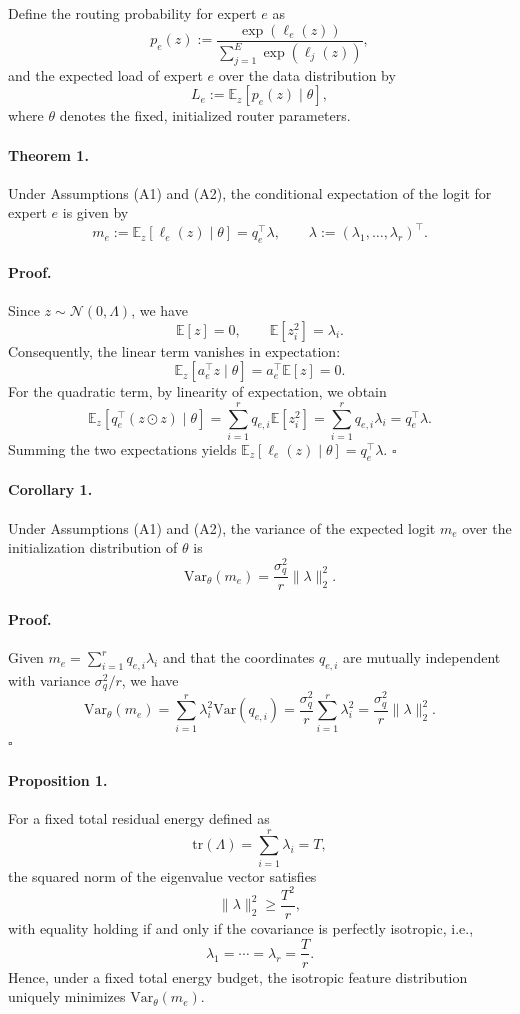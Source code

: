 \documentclass[11pt]{article}
\begin{document}
Define the routing probability for expert $e$ as
$$p_e(z) := \frac{\exp(\ell_e(z))}{\sum_{j=1}^E \exp(\ell_j(z))},$$
and the expected load of expert $e$ over the data distribution by
$$L_e := \mathbb{E}_z[p_e(z)\mid \theta],$$
where $\theta$ denotes the fixed, initialized router parameters.

\paragraph{Theorem 1.}
Under Assumptions (A1) and (A2), the conditional expectation of the logit for expert $e$ is given by
$$m_e := \mathbb{E}_z[\ell_e(z)\mid \theta] = q_e^\top \lambda, \qquad \lambda := (\lambda_1,\dots,\lambda_r)^\top.$$

\paragraph{Proof.}
Since $z \sim \mathcal{N}(0,\Lambda)$, we have
$$\mathbb{E}[z]=0, \qquad \mathbb{E}[z_i^2]=\lambda_i.$$
Consequently, the linear term vanishes in expectation:
$$\mathbb{E}_z[a_e^\top z\mid \theta] = a_e^\top \mathbb{E}[z] = 0.$$
For the quadratic term, by linearity of expectation, we obtain
$$
\mathbb{E}_z[q_e^\top(z\odot z)\mid\theta]
= \sum_{i=1}^r q_{e,i}\mathbb{E}[z_i^2]
= \sum_{i=1}^r q_{e,i}\lambda_i
= q_e^\top \lambda.
$$
Summing the two expectations yields $\mathbb{E}_z[\ell_e(z)\mid\theta]=q_e^\top\lambda$.
\hfill $\square$

\paragraph{Corollary 1.}
Under Assumptions (A1) and (A2), the variance of the expected logit $m_e$ over the initialization distribution of $\theta$ is
$$\mathrm{Var}_\theta(m_e) = \frac{\sigma_q^2}{r}\|\lambda\|_2^2.$$

\paragraph{Proof.}
Given $m_e=\sum_{i=1}^r q_{e,i}\lambda_i$ and that the coordinates $q_{e,i}$ are mutually independent with variance $\sigma_q^2/r$, we have
$$
\mathrm{Var}_\theta(m_e)
= \sum_{i=1}^r \lambda_i^2 \mathrm{Var}(q_{e,i})
= \frac{\sigma_q^2}{r}\sum_{i=1}^r \lambda_i^2
= \frac{\sigma_q^2}{r}\|\lambda\|_2^2.
$$
\hfill $\square$

\paragraph{Proposition 1.}
For a fixed total residual energy defined as
$$\mathrm{tr}(\Lambda) = \sum_{i=1}^r \lambda_i = T,$$
the squared norm of the eigenvalue vector satisfies
$$\|\lambda\|_2^2 \ge \frac{T^2}{r},$$
with equality holding if and only if the covariance is perfectly isotropic, i.e.,
$$\lambda_1=\cdots=\lambda_r=\frac{T}{r}.$$
Hence, under a fixed total energy budget, the isotropic feature distribution uniquely minimizes $\mathrm{Var}_\theta(m_e)$.
\end{document}
